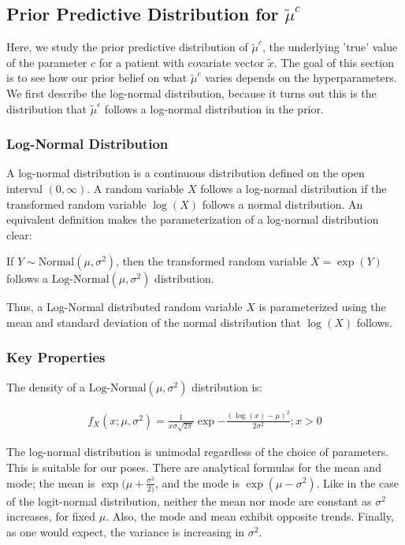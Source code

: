 \subsection{Prior Predictive Distribution for $\tilde{\mu}^c$}
Here, we study the prior predictive distribution of $\tilde{\mu}^c$, the underlying 'true' value of the parameter $c$ for a patient with covariate vector $\tilde{x}$.  The goal of this section is to see how our prior belief on what $\tilde{\mu}^c$ varies depends on the hyperparameters.  We first describe the log-normal distribution, because it turns out this is the distribution that $\tilde{\mu}^c$ follows a log-normal distribution in the prior.

\subsubsection{Log-Normal Distribution}
A log-normal distribution is a continuous distribution defined on the open interval $(0, \infty)$.  A random variable $X$ follows a log-normal distribution if the transformed random variable $\log(X)$ follows a normal distribution.  An equivalent definition makes the parameterization of a log-normal distribution clear:

\begin{defn}
If $Y \sim \textrm{Normal}(\mu, \sigma^2)$, then the transformed random variable $X=\exp(Y)$ follows a $\textrm{Log-Normal}(\mu, \sigma^2)$ distribution.
\end{defn}

Thus, a Log-Normal distributed random variable $X$ is parameterized using the mean and standard deviation of the normal distribution that $\log(X)$ follows.

\subsubsection{Key Properties}

The density of a $\textrm{Log-Normal}(\mu, \sigma^2)$ distribution is:

\begin{eqnarray}
f_X(x;\mu, \sigma^2) = \frac{1}{x\sigma \sqrt{2\pi}} \exp{-\frac{(\log(x) - \mu)^2}{2 \sigma^2}};   x > 0
\end{eqnarray}

The log-normal distribution is unimodal regardless of the choice of parameters.  This is suitable for our poses.  There are analytical formulas for the mean and mode; the mean is $\exp(\mu + \frac{\sigma^2}{2)}$, and the mode is $\exp(\mu - \sigma^2)$.  Like in the case of the logit-normal distribution, neither the mean nor mode are constant as $\sigma^2$ increases, for fixed $\mu$.  Also, the mode and mean exhibit opposite trends.  Finally, as one would expect, the variance is increasing in $\sigma^2$.

